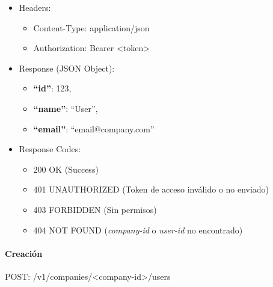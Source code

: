 \documentclass[12pt,a4paperpaper,]{report}
\providecommand{\tightlist}{%
  \setlength{\itemsep}{0pt}\setlength{\parskip}{0pt}}
\let\oldparagraph\paragraph
\renewcommand{\paragraph}[1]{\oldparagraph{#1}\mbox{}}
\begin{document}
\begin{itemize}
\tightlist
\item
  Headers:

  \begin{itemize}
  \tightlist
  \item
    Content-Type: application/json
  \item
    Authorization: Bearer \textless{}token\textgreater{}
  \end{itemize}
\item
  Response (JSON Object):

  \begin{itemize}
  \tightlist
  \item
    \textbf{``id''}: 123,
  \item
    \textbf{``name''}: ``User'',
  \item
    \textbf{``email''}: ``email@company.com''
  \end{itemize}
\item
  Response Codes:

  \begin{itemize}
  \tightlist
  \item
    200 OK (Success)
  \item
    401 UNAUTHORIZED (Token de acceso inválido o no enviado)
  \item
    403 FORBIDDEN (Sin permisos)
  \item
    404 NOT FOUND (\emph{company-id} o \emph{user-id} no encontrado)
  \end{itemize}
\end{itemize}

\paragraph{Creación}\label{creaciuxf3n-1}

POST: /v1/companies/\textless{}company-id\textgreater{}/users
\end{document}
